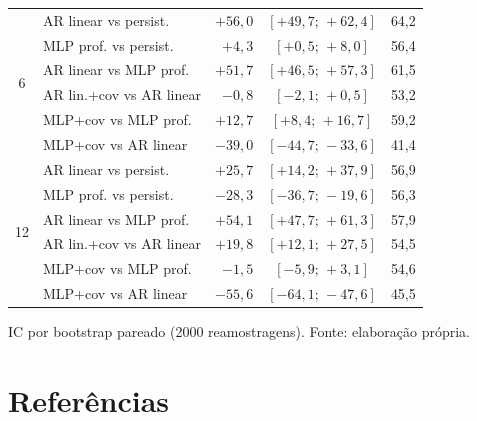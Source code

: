 \documentclass[12pt,a4paper,oneside]{article}
\newcounter{mref}
\begin{document}
\begin{table}[H]
\begin{tabular}{@{}clrcr@{}}
\midrule
\multirow{6}{*}{6}
 & AR linear vs persist. & $+56{,}0$ & $[+49{,}7;\,+62{,}4]$ & 64,2 \\
 & MLP prof. vs persist. & $+4{,}3$ & $[+0{,}5;\,+8{,}0]$ & 56,4 \\
 & AR linear vs MLP prof. & $+51{,}7$ & $[+46{,}5;\,+57{,}3]$ & 61,5 \\
 & AR lin.+cov vs AR linear & $-0{,}8$ & $[-2{,}1;\,+0{,}5]$ & 53,2 \\
 & MLP+cov vs MLP prof. & $+12{,}7$ & $[+8{,}4;\,+16{,}7]$ & 59,2 \\
 & MLP+cov vs AR linear & $-39{,}0$ & $[-44{,}7;\,-33{,}6]$ & 41,4 \\
\midrule
\multirow{6}{*}{12}
 & AR linear vs persist. & $+25{,}7$ & $[+14{,}2;\,+37{,}9]$ & 56,9 \\
 & MLP prof. vs persist. & $-28{,}3$ & $[-36{,}7;\,-19{,}6]$ & 56,3 \\
 & AR linear vs MLP prof. & $+54{,}1$ & $[+47{,}7;\,+61{,}3]$ & 57,9 \\
 & AR lin.+cov vs AR linear & $+19{,}8$ & $[+12{,}1;\,+27{,}5]$ & 54,5 \\
 & MLP+cov vs MLP prof. & $-1{,}5$ & $[-5{,}9;\,+3{,}1]$ & 54,6 \\
 & MLP+cov vs AR linear & $-55{,}6$ & $[-64{,}1;\,-47{,}6]$ & 45,5 \\
\bottomrule
\end{tabular}
\par\smallskip
{\footnotesize IC por bootstrap pareado (\num{2000} reamostragens). Fonte:
elaboração própria.}
\end{table}

\newpage
\section*{Referências}
\setcounter{mref}{0}
\end{document}
